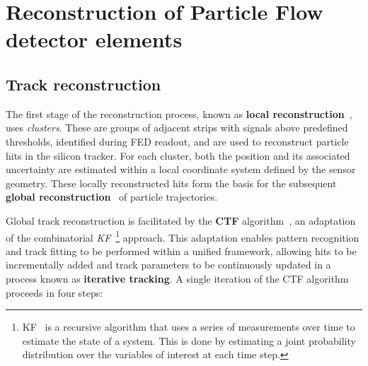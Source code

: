 \section{Reconstruction of Particle Flow detector elements}
\label{Section:Chapter4_Reconstruction_of_PF_elements}
\subsection{Track reconstruction}
The first stage of the reconstruction process, known as \textbf{local reconstruction}~\cite{CMS_TrackerPerformance_2014,CMS_Track_Reconstruction_Run2_3}, uses \textit{clusters}. These are groups of adjacent strips with signals above predefined thresholds, identified during \ac{FED} readout, and are used to reconstruct particle hits in the silicon tracker. For each cluster, both the position and its associated uncertainty are estimated within a local coordinate system defined by the sensor geometry. These locally reconstructed hits form the basis for the subsequent \textbf{global reconstruction}~\cite{CMS_TrackerPerformance_2014,CMS_Track_Reconstruction_Run2_3} of particle trajectories.

Global track reconstruction is facilitated by the \textbf{\ac{CTF}} algorithm~\cite{CMS_TrackerPerformance_2014,CMS_Track_Reconstruction_Run2_3}, an adaptation of the combinatorial \textit{\ac{KF}}~\cite{KF_1,KF_2,KF_3}\footnote{\ac{KF}~\cite{KF_4} is a recursive algorithm that uses a series of measurements over time to estimate the state of a system. This is done by estimating a joint probability distribution over the variables of interest at each time step.} approach. This adaptation enables pattern recognition and track fitting to be performed within a unified framework, allowing hits to be incrementally added and track parameters to be continuously updated in a process known as \textbf{iterative tracking}. A single iteration of the \ac{CTF} algorithm proceeds in four steps:

